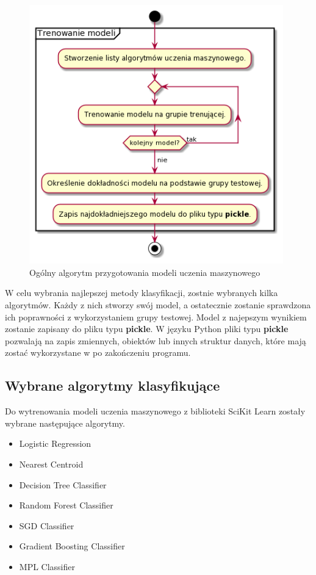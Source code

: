 \begin{figure}[H]
    \begin{center}
        \includegraphics[width=11cm]{../images/train_models.png}
        \caption{Ogólny algorytm przygotowania modeli uczenia maszynowego}
    \end{center}
\end{figure}

\quad W celu wybrania najlepszej metody klasyfikacji, zostnie wybranych kilka algorytmów. Każdy z nich stworzy swój model, a ostatecznie zostanie sprawdzona ich poprawności z wykorzystaniem grupy testowej. Model z najepszym wynikiem zostanie zapisany do pliku typu \textbf{pickle}. W języku Python pliki typu \textbf{pickle} pozwalają na zapis zmiennych, obiektów lub innych struktur danych, które mają zostać wykorzystane w po zakończeniu programu. 

\subsection{Wybrane algorytmy klasyfikujące}

\quad Do wytrenowania modeli uczenia maszynowego z biblioteki SciKit Learn zostały wybrane następujące algorytmy. 

\begin{itemize}
    \item Logistic Regression
    \item Nearest Centroid 
    \item Decision Tree Classifier 
    \item Random Forest Classifier 
    \item SGD Classifier
    \item Gradient Boosting Classifier
    \item MPL Classifier
\end{itemize}

